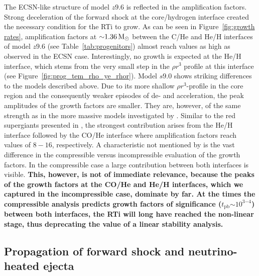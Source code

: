 \documentclass[fleqn,usenatbib]{mnras}
\newcommand{\tpb}{\ensuremath{t_{\text{pb}}}}
\newcommand{\solm}{\ensuremath{\rm{M_{\odot}}}\xspace}
\begin{document}
The ECSN-like structure of model $z9.6$ is reflected in the amplification factors.
Strong deceleration of the forward shock at the core/hydrogen interface created the necessary condition for the RTi to grow. As can be seen in Figure~\ref{fig:growth rates}, amplification factors at $\mathord{\sim}1.36\,\solm$ between the C/He and He/H interfaces of model $z9.6$ (see Table~\ref{tab:progenitors}) almost reach values as high as observed in the ECSN case. Interestingly, no growth is expected at the He/H interface, which stems from the very small step in the $\rho r^3$ profile at this interface (see Figure~\ref{fig:prog_tem_rho_ye_rhor}).
Model $s9.0$ shows striking differences to the models described above. 
Due to its more shallow $\rho r^3$-profile in the core region and the consequently weaker episodes of de- and acceleration, the peak amplitudes of the growth factors are smaller. They are, however, of the same strength as in the more massive models investigated by \cite{Wongwathanarat2015}. 
Similar to the red supergiants presented in \citet{Wongwathanarat2015}, the strongest contribution arises from the He/H interface followed by the CO/He interface where amplification factors  reach values of $8-16$, respectively. 
A characteristic not mentioned by \cite{Wongwathanarat2015} is the vast difference in the compressible versus incompressible evaluation of the growth factors. In the compressible case a large contribution between both interfaces is visible.
\textbf{This, however, is not of immediate relevance, because the peaks of the growth factors at the CO/He and He/H interfaces, which we captured in the incompressible case, dominate by far. At the times the compressible analysis predicts growth factors of significance ($\tpb\mathord{\sim}10^{3\mathord{-}4}$) between both interfaces, the RTi will long have reached the non-linear stage, thus deprecating the value of a linear stability analysis.}

\subsection{Propagation of forward shock and neutrino-heated ejecta }
\end{document}
